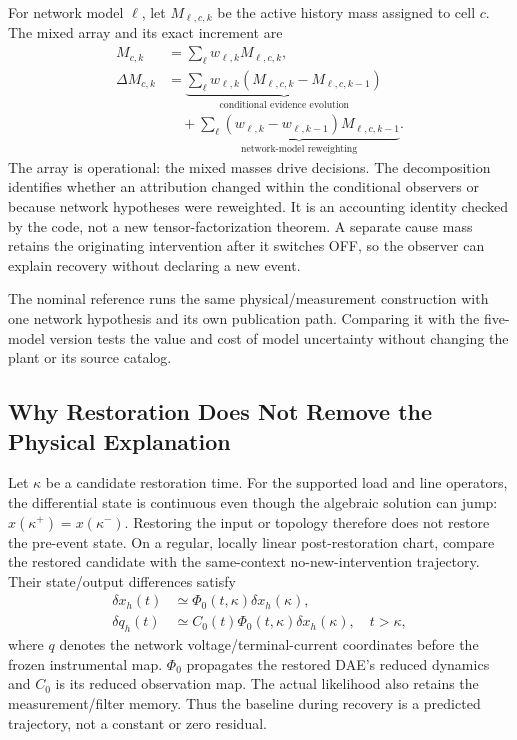 For network model $\ell$, let $M_{\ell,c,k}$ be the active history mass assigned to cell $c$. The mixed array and its exact increment are
\begin{align}
 M_{c,k}&=\sum_\ell w_{\ell,k}M_{\ell,c,k},\nonumber\\
 \Delta M_{c,k}&=\underbrace{\sum_\ell w_{\ell,k}(M_{\ell,c,k}-M_{\ell,c,k-1})}_{\text{conditional evidence evolution}}\nonumber\\
 &\quad+\underbrace{\sum_\ell(w_{\ell,k}-w_{\ell,k-1})M_{\ell,c,k-1}}_{\text{network-model reweighting}}.
 \label{eq:continuous-delta}
\end{align}
The array is operational: the mixed masses drive decisions. The decomposition identifies whether an attribution changed within the conditional observers or because network hypotheses were reweighted. It is an accounting identity checked by the code, not a new tensor-factorization theorem. A separate cause mass retains the originating intervention after it switches OFF, so the observer can explain recovery without declaring a new event.

The nominal reference runs the same physical/measurement construction with one network hypothesis and its own publication path. Comparing it with the five-model version tests the value and cost of model uncertainty without changing the plant or its source catalog.

\subsection{Why Restoration Does Not Remove the Physical Explanation}
\label{sec:recovery-mechanism}

Let $\kappa$ be a candidate restoration time. For the supported load and line
operators, the differential state is continuous even though the algebraic
solution can jump: $x(\kappa^+)=x(\kappa^-)$. Restoring the input or topology
therefore does not restore the pre-event state. On a regular, locally linear
post-restoration chart, compare the restored candidate with the same-context
no-new-intervention trajectory. Their state/output differences satisfy
\begin{align}
 \delta x_h(t)&\simeq\Phi_0(t,\kappa)\delta x_h(\kappa),\nonumber\\
 \delta q_h(t)&\simeq C_0(t)\Phi_0(t,\kappa)\delta x_h(\kappa),
 \quad t>\kappa,
 \label{eq:recovery-response}
\end{align}
where $q$ denotes the network voltage/terminal-current coordinates before
the frozen instrumental map. $\Phi_0$ propagates the restored DAE's reduced
dynamics and $C_0$ is its reduced observation map. The actual likelihood
also retains the measurement/filter memory. Thus the baseline during
recovery is a predicted trajectory, not a constant or zero residual.

